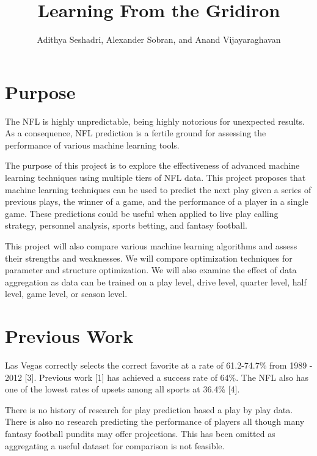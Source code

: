 \documentclass[english]{article}
\begin{document}
\title{Learning From the Gridiron}


\author{Adithya Seshadri, Alexander Sobran, and Anand Vijayaraghavan}

\maketitle

\section*{Purpose}

	The NFL is highly unpredictable, being highly notorious for unexpected results. As a consequence, NFL prediction is a fertile ground for assessing the performance of various machine learning tools. 

The purpose of this project is to explore the effectiveness of advanced machine learning techniques using multiple tiers of NFL data. This project proposes that machine learning techniques can be used to predict the next play given a series of previous plays, the winner of a game, and the performance of a player in a single game. These predictions could be useful when applied to live play calling strategy, personnel analysis, sports betting, and fantasy football.

This project will also compare various machine learning algorithms and assess their strengths and weaknesses. We will compare optimization techniques for parameter and structure optimization. We will also examine the effect of data aggregation as data can be trained on a play level, drive level, quarter level, half level, game level, or season level.

\section*{Previous Work}

Las Vegas correctly selects the correct favorite at a rate of 61.2-74.7\% from 1989 - 2012 [3]. Previous work [1] has achieved a success rate of 64\%. The NFL also has one of the lowest rates of upsets among all sports at 36.4\% [4].

There is no history of research for play prediction based a play by play data. There is also no research predicting the performance of players all though many fantasy football pundits may offer projections. This has been omitted as aggregating a useful dataset for comparison is not feasible.
\end{document}
